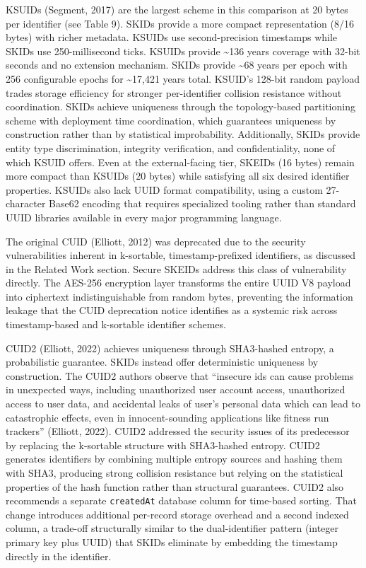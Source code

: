 \documentclass[fleqn,10pt]{wlpeerj}
\newcounter{none} %
\begin{document}
KSUIDs (Segment, 2017) are the largest scheme in this comparison at 20
bytes per identifier (see Table 9). SKIDs provide a more compact
representation (8/16 bytes) with richer metadata. KSUIDs use
second-precision timestamps while SKIDs use 250-millisecond ticks.
KSUIDs provide \textasciitilde136 years coverage with 32-bit seconds and
no extension mechanism. SKIDs provide \textasciitilde68 years per epoch
with 256 configurable epochs for \textasciitilde17,421 years total.
KSUID's 128-bit random payload trades storage efficiency for stronger
per-identifier collision resistance without coordination. SKIDs achieve
uniqueness through the topology-based partitioning scheme with
deployment time coordination, which guarantees uniqueness by
construction rather than by statistical improbability. Additionally,
SKIDs provide entity type discrimination, integrity verification, and
confidentiality, none of which KSUID offers. Even at the external-facing
tier, SKEIDs (16 bytes) remain more compact than KSUIDs (20 bytes) while
satisfying all six desired identifier properties. KSUIDs also lack UUID
format compatibility, using a custom 27-character Base62 encoding that
requires specialized tooling rather than standard UUID libraries
available in every major programming language.

The original CUID (Elliott, 2012) was deprecated due to the security
vulnerabilities inherent in k-sortable, timestamp-prefixed identifiers,
as discussed in the Related Work section. Secure SKEIDs address this
class of vulnerability directly. The AES-256 encryption layer transforms
the entire UUID V8 payload into ciphertext indistinguishable from random
bytes, preventing the information leakage that the CUID deprecation
notice identifies as a systemic risk across timestamp-based and
k-sortable identifier schemes.

CUID2 (Elliott, 2022) achieves uniqueness through SHA3-hashed entropy, a
probabilistic guarantee. SKIDs instead offer deterministic uniqueness by
construction. The CUID2 authors observe that ``insecure ids can cause
problems in unexpected ways, including unauthorized user account access,
unauthorized access to user data, and accidental leaks of user's
personal data which can lead to catastrophic effects, even in
innocent-sounding applications like fitness run trackers'' (Elliott,
2022). CUID2 addressed the security issues of its predecessor by
replacing the k-sortable structure with SHA3-hashed entropy. CUID2
generates identifiers by combining multiple entropy sources and hashing
them with SHA3, producing strong collision resistance but relying on the
statistical properties of the hash function rather than structural
guarantees. CUID2 also recommends a separate \texttt{createdAt} database
column for time-based sorting. That change introduces additional
per-record storage overhead and a second indexed column, a trade-off
structurally similar to the dual-identifier pattern (integer primary key
plus UUID) that SKIDs eliminate by embedding the timestamp directly in
the identifier.
\end{document}
